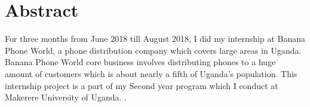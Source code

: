 \cleardoublepage
{}
\chapter*{Abstract}
For three months from June 2018 till August 2018, I did my internship at Banana Phone World, a
phone distribution company which covers large areas in Uganda. Banana Phone World core
business involves distributing phones to a huge amount of customers which is
about nearly a fifth of Uganda's population. This internship project is a part of my Second
year program which I conduct at Makerere University of Uganda. \medskip.

\newpage





